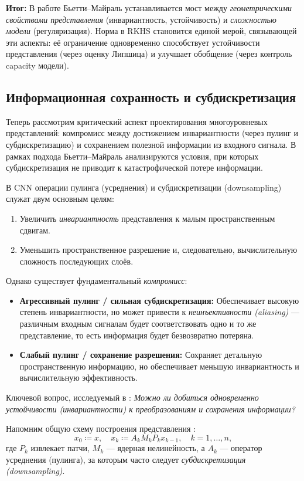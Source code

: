 \documentclass[../NDCNNAI_main.tex]{subfiles}
\begin{document}
\textbf{Итог:} В работе Бьетти--Майраль \cite{Bietti_Group} устанавливается мост между \emph{геометрическими свойствами представления} (инвариантность, устойчивость) и \emph{сложностью модели} (регуляризация). Норма в RKHS становится единой мерой, связывающей эти аспекты: её ограничение одновременно способствует устойчивости представления (через оценку Липшица) и улучшает обобщение (через контроль capacity модели).

\subsection{Информационная сохранность и субдискретизация}

Теперь рассмотрим критический аспект проектирования многоуровневых представлений: компромисс между достижением инвариантности (через пулинг и субдискретизацию) и сохранением полезной информации из входного сигнала. В рамках подхода Бьетти--Майраль \cite{Bietti_Group} анализируются условия, при которых субдискретизация не приводит к катастрофической потере информации.

В CNN операции пулинга (усреднения) и субдискретизации (downsampling) служат двум основным целям:
\begin{enumerate}
    \item Увеличить \emph{инвариантность} представления к малым пространственным сдвигам.
    \item Уменьшить пространственное разрешение и, следовательно, вычислительную сложность последующих слоёв.
\end{enumerate}

Однако существует фундаментальный \emph{компромисс}:
\begin{itemize}
    \item \textbf{Агрессивный пулинг / сильная субдискретизация:} Обеспечивает высокую степень инвариантности, но может привести к \emph{неинъективности (aliasing)} --- различным входным сигналам будет соответствовать одно и то же представление, то есть информация будет безвозвратно потеряна.
    \item \textbf{Слабый пулинг / сохранение разрешения:} Сохраняет детальную пространственную информацию, но обеспечивает меньшую инвариантность и вычислительную эффективность.
\end{itemize}
Ключевой вопрос, исследуемый в \cite{Bietti_Group}: \emph{Можно ли добиться одновременно устойчивости (инвариантности) к преобразованиям и сохранения информации?}

Напомним общую схему построения представления \cite{Bietti_Group}:
\[
x_0 \coloneq x, \quad x_k \coloneq A_k M_k P_k x_{k-1}, \quad k = 1, \ldots, n,
\]
где \(P_k\) извлекает патчи, \(M_k\) --- ядерная нелинейность, а \(A_k\) --- оператор усреднения (пулинга), за которым часто следует \emph{субдискретизация (downsampling)}.
\end{document}
